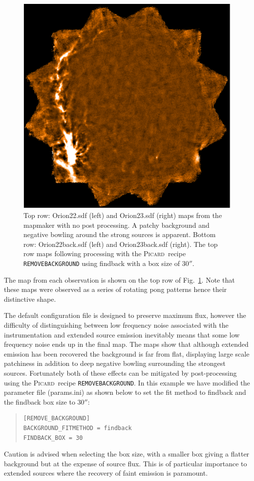 \documentclass[twoside,11pt]{article}
\newcommand{\xref}[3]{#1}
\renewcommand{\_}{\texttt{\symbol{95}}}
\newenvironment{myquote}{\begin{quote}\begin{small}}{\end{small}\end{quote}}
\newcommand{\picard}{\xref{\textsc{Picard}}{sun231}{}}
\newcommand{\drrecipe}[1]{\texttt{#1}}
\begin{document}
\begin{figure}
\begin{center}
\includegraphics[width=0.49\hsize]{sc19_map23_back.eps}
\caption{Top row: Orion22.sdf (left) and Orion23.sdf (right) maps from
  the mapmaker with no post processing. A patchy background and
  negative bowling around the strong sources is apparent. Bottom row:
  Orion22\_back.sdf (left) and Orion23\_back.sdf (right). The top row
  maps following processing with the \picard\ recipe \drrecipe{REMOVE\_BACKGROUND}
  using findback with a box size of 30$''$.}
\label{fig:orionmakemap}
\end{center}
\end{figure}
The map from each observation is shown on the top row of
Fig.~\ref{fig:orionmakemap}. Note that these maps were observed as a
series of rotating pong patterns hence their distinctive shape.

The default configuration file is designed to preserve maximum flux,
however the difficulty of distinguishing between low frequency noise
associated with the instrumentation and extended source emission
inevitably means that some low frequency noise ends up in the final
map. The maps show that although extended emission has been recovered
the background is far from flat, displaying large scale patchiness in
addition to deep negative bowling surrounding the strongest
sources. Fortunately both of these effects can be mitigated by
post-processing using the \picard\ recipe \drrecipe{REMOVE\_BACKGROUND}. In this
example we have modified the parameter file (params.ini) as shown
below to set the fit method to findback and the findback box size to
30$''$:
\begin{myquote}
\begin{verbatim}
[REMOVE_BACKGROUND]
BACKGROUND_FITMETHOD = findback
FINDBACK_BOX = 30
\end{verbatim}
\end{myquote}
Caution is advised when selecting the box size, with a smaller box
giving a flatter background but at the expense of source flux. This is
of particular importance to extended sources where the recovery of
faint emission is paramount.
\end{document}
